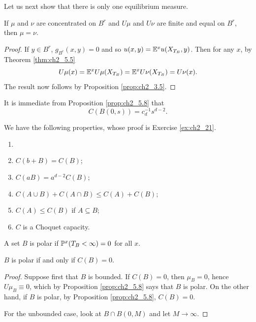 Let us next show that there is only one equilibrium measure.

\begin{proposition}\label{prop:ch2_5.10}
If $\mu$ and $\nu$ are concentrated on $B^r$ and $U\mu$ and $U\nu$ are finite and equal on $B^r$, then $\mu = \nu$.
\end{proposition}

\begin{proof}
If $y \in B^r$, $g_{B^c}(x,y) = 0$ and so $u(x,y) = \E^xu(X_{T_B},y)$. Then for any
$x$, by Theorem \ref{thm:ch2_5.5}
\[
    U\mu(x) = \E^xU\mu(X_{T_B}) = \E^xU\nu(X_{T_B}) = U\nu(x).
\]
The result now follows by Proposition \ref{prop:ch2_3.5}.
\end{proof}

It is immediate from Proposition \ref{prop:ch2_5.8} that
\begin{equation}\label{eq:ch2_5.11}
    C(B(0,s)) = c_d^{-1}s^{d-2}.
\end{equation}

We have the following properties, whose proof is Exercise \ref{ex:ch2_21}.

\begin{proposition}\label{prop:ch2_5.11}
\begin{enumerate}
    \item[]
    \item $C(b + B) = C(B)$;
    \item $C(aB) = a^{d-2}C(B)$;
    \item $C(A \cup B) + C(A \cap B) \leq C(A) + C(B)$;
    \item $C(A) \leq C(B)$ if $A \subseteq B$;
    \item $C$ is a Choquet capacity.
\end{enumerate}
\end{proposition}

\begin{definition}\label{def:ch2_5.12}
A set $B$ is polar if $\P^x(T_B < \infty) = 0$ for all $x$.
\end{definition}

\begin{proposition}\label{prop:ch2_5.13}
$B$ is polar if and only if $C(B) = 0$.
\end{proposition}

\begin{proof}
Suppose first that $B$ is bounded. If $C(B) = 0$, then $\mu_B = 0$, hence $U\mu_B \equiv 0$, which by Proposition \ref{prop:ch2_5.8} says that $B$ is polar. On the other hand, if $B$ is polar, by Proposition \ref{prop:ch2_5.8}, $C(B) = 0$.

For the unbounded case, look at $B \cap B(0,M)$ and let $M \to \infty$.
\end{proof}

